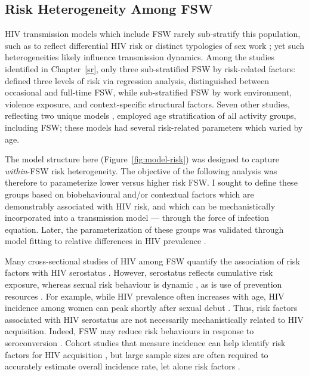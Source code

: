 \subsection{Risk Heterogeneity Among FSW}\label{model.par.fsw}
HIV transmission models which include FSW rarely sub-stratify this population, such as to reflect
differential HIV risk or distinct typologies of sex work \cite{Blanchard2008,Scorgie2012};
yet such heterogeneities likely influence transmission dynamics.
Among the studies identified in Chapter~\ref{sr},
only three sub-stratified FSW by risk-related factors:
\citet{Cremin2017} defined three levels of risk via regression analysis,
\citet{Low2015} distinguished between occasional and full-time FSW, while
\citet{Shannon2015} sub-stratified FSW by
work environment, violence exposure, and context-specific structural factors.
Seven other studies, reflecting two unique models \cite{Johnson2012,Maheu-Giroux2017},
employed age stratification of all activity groups, including FSW;
these models had several risk-related parameters which varied by age.
\par
The model structure here (Figure~\ref{fig:model-risk})
was designed to capture \emph{within}-FSW risk heterogeneity.
The objective of the following analysis was therefore to parameterize
lower versus higher risk FSW.
I sought to define these groups based on biobehavioural and/or contextual factors
which are demonstrably associated with HIV risk,
and which can be mechanistically incorporated into a transmission model ---
\ie through the force of infection equation.
Later, the parameterization of these groups was validated through model fitting
to relative differences in HIV prevalence .
\par
Many cross-sectional studies of HIV among FSW quantify
the association of risk factors with HIV serostatus
\cite{Aklilu2001,Dunkle2005,Scorgie2012,Jonas2020}.
However, serostatus reflects cumulative risk exposure,
whereas sexual risk behaviour is dynamic \cite{Watts2010,vanWees2020},
as is use of prevention resources \cite{Roberts2020}.
For example, while HIV prevalence often increases with age,
HIV incidence among women can peak shortly after sexual debut \cite{Dellar2015}.
Thus, risk factors associated with HIV serostatus are not necessarily
mechanistically related to HIV acquisition.
Indeed, FSW may reduce risk behaviours in response to seroconversion \cite{McClelland2006}.
Cohort studies that measure incidence
can help identify risk factors for HIV acquisition \cite{McKinnon2015,Nouaman2022},
but large sample sizes are often required to accurately estimate overall incidence rate,
let alone risk factors \cite{Priddy2011}.
